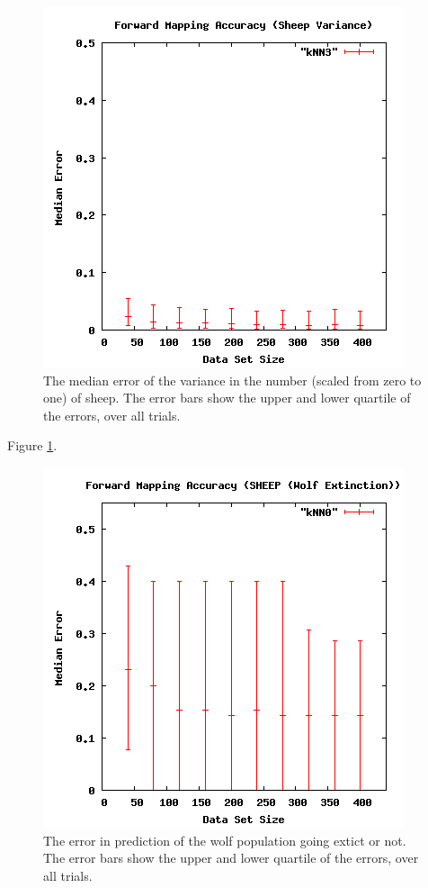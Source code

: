 \begin{figure}[ht]
\centering
\includegraphics[scale=.5]{images/results_wolfsheep/fm-sheep-var.png}
\caption{The median error of the variance in the number (scaled from zero to one) of sheep.
The error bars show the upper and lower quartile of the errors, over all trials.}
\label{fig:wolfsheepvar}
\end{figure}

Figure \ref{fig:wolfsheepvar}.

\begin{figure}[ht]
\centering
\includegraphics[scale=.5]{images/results_wolfsheep/fm-wolf-extict.png}
\caption{The error in prediction of the wolf population going extict or not.
The error bars show the upper and lower quartile of the errors, over all trials.}
\label{fig:wolfsheepextinct}
\end{figure}

